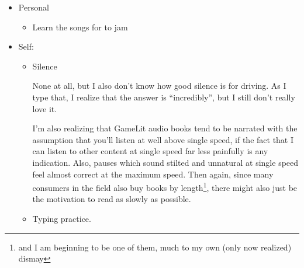 \documentclass[12pt]{article}
\newcommand{\say}[1]{``#1''}
\renewcommand{\,}{\textsuperscript{,}}
\begin{document}
\begin{itemize}
\begin{itemize}
\begin{itemize}
\item Start citation tracking

Continuing to load papers into the citation manager.  
I should start making annotated bibliography, because that's something that many people use for some reason.\footnote{why? Eh could be a fun appendix \say{here's the list of things that someone learning rotational spectroscopy should actually read and what they should get from it}, since like each textbook cites at least 500 different articles (and a shocking number of other textbooks, gotta love that the research in the field actually happens and is published in textbooks (or at least did, back in the good old days when the field was being actively advanced)). I've definitely found that each of them has complementary information, and I would save myself a headache by noting down what each one has at different points.}

\end{itemize}

\item Personal

\begin{itemize}

\item Learn the songs for to jam

\end{itemize}

\item Self:

\begin{itemize}

\item Silence

None at all, but I also don't know how good silence is for driving.  
As I type that, I realize that the answer is \say{incredibly}, but I still don't really love it.

I'm also realizing that GameLit audio books tend to be narrated with the assumption that you'll listen at well above single speed, if the fact that I can listen to other content at single speed far less painfully is any indication.  
Also, pauses which sound stilted and unnatural at single speed feel almost correct at the maximum speed.  
Then again, since many consumers in the field also buy books by length\footnote{and I am beginning to be one of them, much to my own (only now realized) dismay}, there might also just be the motivation to read as slowly as possible.

\item Typing practice.


\end{itemize}
\end{itemize}
\end{itemize}
\end{document}
